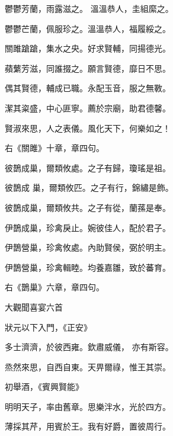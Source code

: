\begin{pinyinscope}
 鬱鬱芳蘭，雨露滋之。
 溫溫恭人，圭組縻之。



 鬱鬱芒蘭，佩服珍之。溫溫恭人，福履綏之。



 關雎蹌蹌，集水之央。好求賢輔，同揚德光。



 蘋蘩芳滋，同誰掇之。願言賢德，靡日不思。



 偶其賢德，輔成已職。永配玉音，服之無斁。



 潔其粢盛，中心匪寧。薦於宗廟，助君德馨。



 賢淑來思，人之表儀。風化天下，何樂如之！



 右《關雎》十章，章四句。



 彼鵲成巢，爾類攸處。之子有歸，瓊瑤是祖。



 彼鵲成
 巢，爾類攸匹。之子有行，錦繡是飾。



 彼鵲成巢，爾類攸共。之子有從，蘭蓀是奉。



 伊鵲成巢，珍禽戾止。婉彼佳人，配於君子。



 伊鵲營巢，珍禽攸處。內助賢侯，弼於明主。



 伊鵲營巢，珍禽輯睦。均養嘉雛，致於蕃育。



 右《鵲巢》六章，章四句。



 大觀聞喜宴六首



 狀元以下入門，《正安》



 多士濟濟，於彼西雍。欽肅威儀，
 亦有斯容。



 烝然來思，自西自東。天畀爾祿，惟王其崇。



 初舉酒，《賓興賢能》



 明明天子，率由舊章。思樂泮水，光於四方。



 薄採其芹，用賓於王。我有好爵，置彼周行。




\end{pinyinscope}

